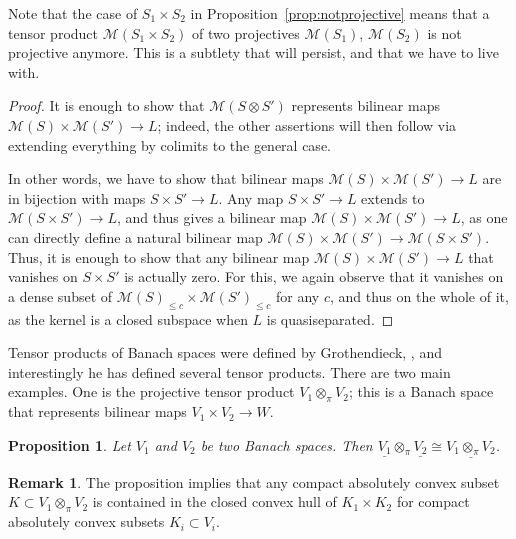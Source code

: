 \documentclass[11pt]{amsbook}
\numberwithin{equation}{section}
\numberwithin{theorem}{section}
\newtheorem{proposition}[theorem]{Proposition}
\theoremstyle{definition}
\newtheorem{remark}[theorem]{Remark}
\begin{document}
Note that the case of $S_1\times S_2$ in Proposition~\ref{prop:notprojective} means that a tensor product $\mathcal M(S_1\times S_2)$ of two projectives $\mathcal M(S_1)$, $\mathcal M(S_2)$ is not projective anymore. This is a subtlety that will persist, and that we have to live with.

\begin{proof} It is enough to show that $\mathcal M(S\otimes S')$ represents bilinear maps $\mathcal M(S)\times \mathcal M(S')\to L$; indeed, the other assertions will then follow via extending everything by colimits to the general case.

In other words, we have to show that bilinear maps $\mathcal M(S)\times \mathcal M(S')\to L$ are in bijection with maps $S\times S'\to L$. Any map $S\times S'\to L$ extends to $\mathcal M(S\times S')\to L$, and thus gives a bilinear map $\mathcal M(S)\times \mathcal M(S')\to L$, as one can directly define a natural bilinear map $\mathcal M(S)\times \mathcal M(S')\to \mathcal M(S\times S')$. Thus, it is enough to show that any bilinear map $\mathcal M(S)\times \mathcal M(S')\to L$ that vanishes on $S\times S'$ is actually zero. For this, we again observe that it vanishes on a dense subset of $\mathcal M(S)_{\leq c}\times \mathcal M(S')_{\leq c}$ for any $c$, and thus on the whole of it, as the kernel is a closed subspace when $L$ is quasiseparated.
\end{proof}

Tensor products of Banach spaces were defined by Grothendieck, \cite{GrothendieckTensor}, and interestingly he has defined several tensor products. There are two main examples. One is the projective tensor product $V_1\otimes_\pi V_2$; this is a Banach space that represents bilinear maps $V_1\times V_2\to W$.

\begin{proposition} Let $V_1$ and $V_2$ be two Banach spaces. Then $\underline{V_1}\otimes_\pi \underline{V_2}\cong \underline{V_1\otimes_\pi V_2}$.
\end{proposition}

\begin{remark} The proposition implies that any compact absolutely convex subset $K\subset V_1\otimes_\pi V_2$ is contained in the closed convex hull of $K_1\times K_2$ for compact absolutely convex subsets $K_i\subset V_i$.
\end{remark}
\end{document}
